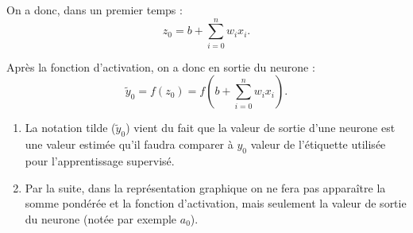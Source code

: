 \begin{defi}
On a donc, dans un premier temps  :
$$z_0 = b+ \sum\limits_{i=0}^{n} w_i x_i. $$

Après la fonction d'activation, on a donc en sortie du neurone :
$$\tilde{y}_0 = f(z_0)=f \left( b+ \sum\limits_{i=0}^{n} w_i x_i\right).$$

\begin{rem}
\begin{enumerate}
\item La notation tilde ($\tilde{y}_0$) vient du fait que la valeur de sortie d'une neurone est une valeur estimée qu'il faudra comparer à ${y}_0$ valeur de l'étiquette utilisée pour l'apprentissage supervisé.
\item Par la suite, dans la représentation graphique on ne fera pas apparaître la somme pondérée et la fonction d'activation, mais seulement la valeur de sortie du neurone (notée par exemple $a_0$).
\end{enumerate}
\end{rem}

\end{defi}




